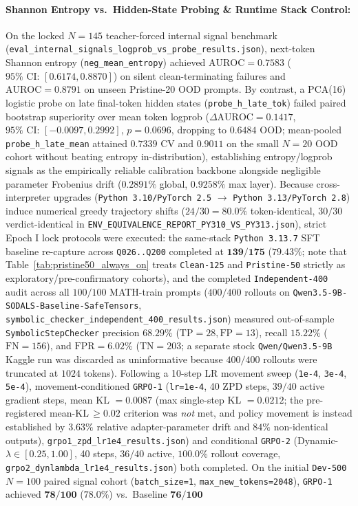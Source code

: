 \documentclass[11pt,a4paper]{article}
\begin{document}
\paragraph{Shannon Entropy vs.\ Hidden-State Probing \& Runtime Stack Control:}
On the locked $N=145$ teacher-forced internal signal benchmark (\texttt{eval\_internal\_signals\_logprob\_vs\_probe\_results.json}), next-token Shannon entropy (\texttt{neg\_mean\_entropy}) achieved $\text{AUROC} = \mathbf{0.7583}$ ($95\%\text{ CI: }[0.6174, 0.8870]$) on silent clean-terminating failures and $\text{AUROC} = \mathbf{0.8791}$ on unseen Pristine-20 OOD prompts. By contrast, a PCA(16) logistic probe on late final-token hidden states (\texttt{probe\_h\_late\_tok}) failed paired bootstrap superiority over mean token logprob ($\Delta\text{AUROC}=0.1417$, $95\%\text{ CI: }[-0.0097, 0.2992]$, $p=0.0696$, dropping to $0.6484$ OOD; mean-pooled \texttt{probe\_h\_late\_mean} attained $0.7339$ CV and $0.9011$ on the small $N=20$ OOD cohort without beating entropy in-distribution), establishing entropy/logprob signals as the empirically reliable calibration backbone alongside negligible parameter Frobenius drift ($0.2891\%$ global, $0.9258\%$ max layer). Because cross-interpreter upgrades (\texttt{Python 3.10/PyTorch 2.5} $\to$ \texttt{Python 3.13/PyTorch 2.8}) induce numerical greedy trajectory shifts ($24/30 = 80.0\%$ token-identical, $30/30$ verdict-identical in \texttt{ENV\_EQUIVALENCE\_REPORT\_PY310\_VS\_PY313.json}), strict Epoch I lock protocols were executed: the same-stack \texttt{Python 3.13.7} SFT baseline re-capture across \texttt{Q026..Q200} completed at $\mathbf{139 / 175}$ ($\mathbf{79.43\%}$; note that Table~\ref{tab:pristine50_always_on} treats \texttt{Clean-125} and \texttt{Pristine-50} strictly as exploratory/pre-confirmatory cohorts), and the completed \texttt{Independent-400} audit across all $100/100$ MATH-train prompts ($400/400$ rollouts on \texttt{Qwen3.5-9B-SODALS-Baseline-SafeTensors}, \texttt{symbolic\_checker\_independent\_400\_results.json}) measured out-of-sample \texttt{SymbolicStepChecker} precision $\mathbf{68.29\%}$ ($\text{TP}=28, \text{FP}=13$), recall $\mathbf{15.22\%}$ ($\text{FN}=156$), and $\text{FPR}=\mathbf{6.02\%}$ ($\text{TN}=203$; a separate stock \texttt{Qwen/Qwen3.5-9B} Kaggle run was discarded as uninformative because $400/400$ rollouts were truncated at $1024$ tokens). Following a 10-step LR movement sweep (\texttt{1e-4}, \texttt{3e-4}, \texttt{5e-4}), movement-conditioned \texttt{GRPO-1} (\texttt{lr=1e-4}, 40 ZPD steps, $39/40$ active gradient steps, mean KL $=0.0087$ (max single-step KL $=0.0212$; the pre-registered mean-KL$\,\geq 0.02$ criterion was \emph{not} met, and policy movement is instead established by $3.63\%$ relative adapter-parameter drift and $84\%$ non-identical outputs), \texttt{grpo1\_zpd\_lr1e4\_results.json}) and conditional \texttt{GRPO-2} (Dynamic-$\lambda \in [0.25, 1.00]$, 40 steps, $36/40$ active, $100.0\%$ rollout coverage, \texttt{grpo2\_dynlambda\_lr1e4\_results.json}) both completed. On the initial \texttt{Dev-500} $N=100$ paired signal cohort (\texttt{batch\_size=1}, \texttt{max\_new\_tokens=2048}), \texttt{GRPO-1} achieved $\mathbf{78/100}$ ($\mathbf{78.0\%}$) vs.\ Baseline $\mathbf{76/100}$ 
\end{document}
